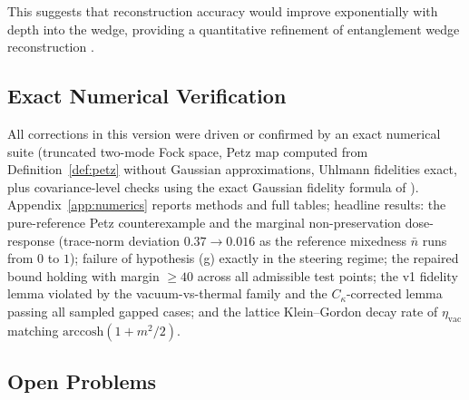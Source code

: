 \documentclass[11pt,a4paper]{article}
\theoremstyle{plain}
\theoremstyle{definition}
\theoremstyle{remark}
\newcommand{\etavac}{\eta_{\mathrm{vac}}}
\newcommand{\Ckappa}{C_{\kappa}}
\begin{document}
This suggests that reconstruction accuracy would improve exponentially with depth
into the wedge, providing a quantitative refinement of entanglement wedge
reconstruction \cite{DongHW16,JLMS16}.

\subsection{Exact Numerical Verification}\label{sec:numsummary}

All corrections in this version were driven or confirmed by an exact numerical
suite (truncated two-mode Fock space, Petz map computed from
Definition~\ref{def:petz} without Gaussian approximations, Uhlmann fidelities
exact, plus covariance-level checks using the exact Gaussian fidelity formula of
\cite{BanchiBP15}). Appendix~\ref{app:numerics} reports methods and full tables;
headline results: the pure-reference Petz counterexample and the marginal
non-preservation dose-response (trace-norm deviation $0.37 \to 0.016$ as the
reference mixedness $\bar{n}$ runs from $0$ to $1$); failure of hypothesis (g)
exactly in the steering regime; the repaired bound holding with margin $\ge 40$
across all admissible test points; the v1 fidelity lemma violated by the
vacuum-vs-thermal family and the $\Ckappa$-corrected lemma passing all sampled
gapped cases; and the lattice Klein--Gordon decay rate of $\etavac$ matching
$\mathrm{arccosh}(1 + m^2/2)$.

\subsection{Open Problems}\label{sec:open}
\end{document}
